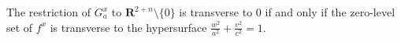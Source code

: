 \documentclass[10pt,a4paper]{amsart}
\newcommand{\R}{\mathbf{R}}
\begin{document}
\begin{lemma}\label{lem:propertyFa}
  The restriction of $G^x_a$ to $\R^{2+n}\setminus\{0\}$ is transverse to $0$ if and only if the zero-level set of $f^x$ is transverse to the hypersurface $ \frac{w^2}{a^2}+\frac{v^2}{c^2} = 1$.
\end{lemma}
\end{document}
